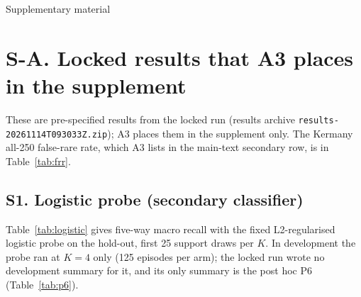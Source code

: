 \clearpage
\onecolumn
\setcounter{table}{0}
\renewcommand{\thetable}{S\arabic{table}}
\renewcommand{\theHtable}{S\arabic{table}}
\setcounter{figure}{0}
\renewcommand{\thefigure}{S\arabic{figure}}
\renewcommand{\theHfigure}{S\arabic{figure}}
\begin{center}
{\Large Supplementary material}
\end{center}

\section*{S-A. Locked results that A3 places in the supplement}
These are pre-specified results from the locked run (results archive \texttt{results-20261114T093033Z.zip}); A3 places them in the supplement only. The Kermany all-250 false-rare rate, which A3 lists in the main-text secondary row, is in Table~\ref{tab:frr}.

\subsection*{S1. Logistic probe (secondary classifier)}
Table~\ref{tab:logistic} gives five-way macro recall with the fixed L2-regularised logistic probe on the hold-out, first 25 support draws per $K$. In development the probe ran at $K=4$ only (125 episodes per arm); the locked run wrote no development summary for it, and its only summary is the post hoc P6 (Table~\ref{tab:p6}).

\begin{table}[!htbp]
\caption{Hold-out five-way macro recall with the fixed logistic probe (secondary classifier), first 25 support draws per $K$. Paired rows: difference from Inception-v3 on the same draws.}
\label{tab:logistic}
\centering\footnotesize

\end{table}

